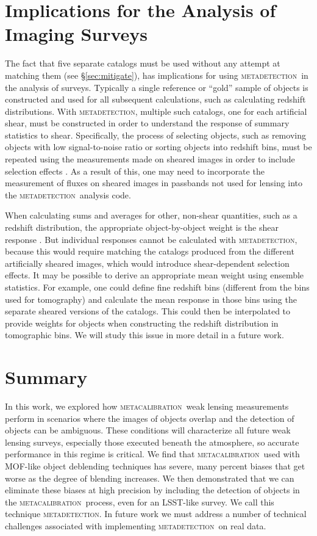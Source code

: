 \documentclass[iop, appendixfloats, numberedappendix, apj]{emulateapj}
\newcommand{\mcal}{\textsc{metacalibration}}
\newcommand{\mdet}{\textsc{metadetection}}
\begin{document}
\section{Implications for the Analysis of Imaging Surveys} \label{sec:wavg}

The fact that five separate catalogs must be used without any attempt at
matching them (see \S \ref{sec:mitigate}), has implications for using \mdet\ in
the analysis of surveys.  Typically a single reference or ``gold'' sample of
objects is constructed and used for all subsequent calculations, such as
calculating redshift distributions.  With \mdet, multiple such catalogs, one
for each artificial shear, must be constructed in order to understand the
response of summary statistics to shear.  Specifically, the process of
selecting objects, such as removing objects with low signal-to-noise ratio or
sorting objects into redshift bins, must be repeated using the measurements made on
sheared images in order to include selection effects \citep{SheldonMcal2017}.
As a result of this, one may need to incorporate the measurement of fluxes
on sheared images in passbands not used for lensing into the \mdet\ analysis
code.

When calculating sums and averages for other, non-shear quantities, such as a
redshift distribution, the appropriate object-by-object weight is the shear
response \citep{SheldonMcal2017}.  But individual responses cannot be
calculated with \mdet, because this would require matching the catalogs
produced from the different artificially sheared images, which would introduce
shear-dependent selection effects.  It may be possible to derive an appropriate
mean weight using ensemble statistics.  For example, one could define fine
redshift bins (different from the bins used for tomography) and calculate the
mean response in those bins using the separate sheared versions of the
catalogs. This could then be interpolated to provide weights for objects when
constructing the redshift distribution in tomographic bins.  We will study this
issue in more detail in a future work.


\section{Summary}\label{sec:conc}

In this work, we explored how \mcal\ weak lensing measurements perform in
scenarios where the images of objects overlap and the detection of objects can
be ambiguous. These conditions will characterize all future weak lensing
surveys, especially those executed beneath the atmosphere, so accurate
performance in this regime is critical. We find that \mcal\ used with MOF-like
object deblending techniques has severe, many percent biases that get worse as
the degree of blending increases. We then demonstrated that we can eliminate
these biases at high precision by including the detection of objects in the
\mcal\ process, even for an LSST-like survey. We call this technique \mdet.
In future work we must address a number of technical challenges associated
with implementing \mdet\ on real data.
\end{document}

